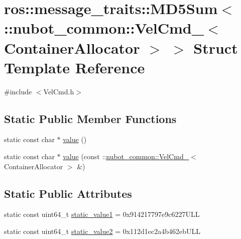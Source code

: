 \hypertarget{structros_1_1message__traits_1_1MD5Sum_3_01_1_1nubot__common_1_1VelCmd___3_01ContainerAllocator_01_4_01_4}{\section{ros\-:\-:message\-\_\-traits\-:\-:M\-D5\-Sum$<$ \-:\-:nubot\-\_\-common\-:\-:Vel\-Cmd\-\_\-$<$ Container\-Allocator $>$ $>$ Struct Template Reference}
\label{structros_1_1message__traits_1_1MD5Sum_3_01_1_1nubot__common_1_1VelCmd___3_01ContainerAllocator_01_4_01_4}
}


{\ttfamily \#include $<$Vel\-Cmd.\-h$>$}

\subsection*{Static Public Member Functions}
\begin{DoxyCompactItemize}
\item 
static const char $\ast$ \hyperlink{structros_1_1message__traits_1_1MD5Sum_3_01_1_1nubot__common_1_1VelCmd___3_01ContainerAllocator_01_4_01_4_a4a231a36357311e0dcb11acfa7a30e08}{value} ()
\item 
static const char $\ast$ \hyperlink{structros_1_1message__traits_1_1MD5Sum_3_01_1_1nubot__common_1_1VelCmd___3_01ContainerAllocator_01_4_01_4_a41ec19d817a99f0eb7a40e29f69f3534}{value} (const \-::\hyperlink{structnubot__common_1_1VelCmd__}{nubot\-\_\-common\-::\-Vel\-Cmd\-\_\-}$<$ Container\-Allocator $>$ \&)
\end{DoxyCompactItemize}
\subsection*{Static Public Attributes}
\begin{DoxyCompactItemize}
\item 
static const uint64\-\_\-t \hyperlink{structros_1_1message__traits_1_1MD5Sum_3_01_1_1nubot__common_1_1VelCmd___3_01ContainerAllocator_01_4_01_4_abd3f20b933d4021c31dc4f5885b19215}{static\-\_\-value1} = 0x914217797e9c6227\-U\-L\-L
\item 
static const uint64\-\_\-t \hyperlink{structros_1_1message__traits_1_1MD5Sum_3_01_1_1nubot__common_1_1VelCmd___3_01ContainerAllocator_01_4_01_4_a51412744eafb39eb84c4d92be08f4ce9}{static\-\_\-value2} = 0x112d1ec2a4b462eb\-U\-L\-L
\end{DoxyCompactItemize}


